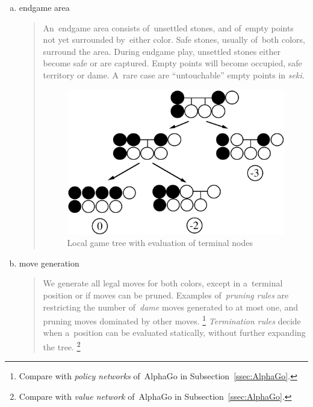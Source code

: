 \begin{enumerate}[(a)]
  \item endgame area
    \begin{quotation}
      An~endgame area consists of~unsettled stones, and of~empty points not yet surrounded by~either color.
      Safe stones, usually of~both colors, surround the area.
      During endgame play, unsettled stones either become safe or are captured.
      Empty points will become occupied, safe territory or dame.
      A~rare case are ``untouchable'' empty points in \emph{seki}.

      \begin{figure}[H]
        \centering
        \includegraphics[width=.7\textwidth]{../img/Go_search_tree.png}
        \caption{Local game tree with evaluation of terminal nodes}
      \end{figure}
    \end{quotation}

  \item move generation
    \begin{quotation}
      We generate all legal moves for both colors, except in a~terminal position or if moves can be pruned.
      Examples of~\emph{pruning rules} are restricting the number of~\emph{dame} moves generated to at most one, and pruning moves dominated by other moves.%
      \footnote{Compare with \emph{policy networks} of~AlphaGo in Subsection~\ref{ssec:AlphaGo}.}
      \emph{Termination rules} decide when a~position can be evaluated statically, without further expanding the tree.%
      \footnote{Compare with \emph{value network} of~AlphaGo in Subsection~\ref{ssec:AlphaGo}.}
    \end{quotation}


\end{enumerate}

